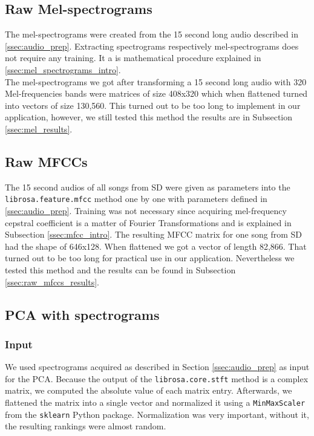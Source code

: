\subsection{Raw Mel-spectrograms}\label{ssec:raw_mels_experiments}
The mel-spectrograms were created from the 15 second long audio described in
\ref{ssec:audio_prep}. Extracting spectrograms respectively mel-spectrograms
does not require any training. It a is mathematical procedure explained in
\ref{ssec:mel_spectrograms_intro}. \\
The mel-spectrograms we got after transforming a 15 second long audio with 320 Mel-frequencies bands were matrices of size 408x320 which when flattened turned into vectors of size 130,560. This turned out to be too long to implement in our application, however, we still tested this method the results are in Subsection \ref{ssec:mel_results}. \\

\subsection{Raw MFCCs}\label{ssec:raw_mfccs_experiments}
The 15 second audios of all songs from SD were given as parameters into the \texttt{librosa.feature.mfcc} method one by one with parameters defined in \ref{ssec:audio_prep}. Training was not necessary since acquiring mel-frequency cepstral coefficient is a matter of Fourier Transformations and is explained in Subsection  \ref{ssec:mfcc_intro}. The resulting MFCC matrix for one song from SD had the shape of 646x128. When flattened we got a vector of length 82,866. That turned out to be too long for practical use in our application. Nevertheless we tested this method and the results can be found in Subsection \ref{ssec:raw_mfccs_results}.

\subsection{PCA with spectrograms}\label{ssec:PCA_spec_experiments}

\subsubsection{Input}
We used spectrograms acquired as described in Section \ref{ssec:audio_prep} as input for the PCA. Because the output of the \texttt{librosa.core.stft} method is a complex matrix, we computed the absolute value of each matrix entry. Afterwards, we flattened the matrix into a single vector and normalized it using a \texttt{MinMaxScaler} from the \texttt{sklearn} Python package. Normalization was very important, without it, the resulting rankings were almost random.

